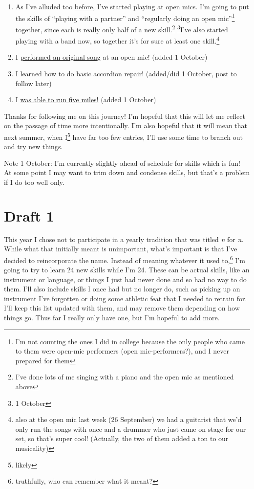 \documentclass[12pt]{article}[titlepage]
\newcommand{\say}[1]{``#1''}
\newcommand{\1}{\={a}}
\newcommand{\2}{\={e}}
\newcommand{\3}{\={\i}}
\newcommand{\4}{\=o}
\newcommand{\5}{\=u}
\newcommand{\6}{\={A}}
\renewcommand{\,}{\textsuperscript{,}}
\begin{document}
\begin{enumerate}
\item As I've alluded too \href{open-mic-2.html}{before}, I've started playing at open mics.
I'm going to put the skills of \say{playing with a partner} and \say{regularly doing an open mic}\footnote{I'm not counting the ones I did in college because the only people who came to them were open-mic performers (open mic-performers?), and I never prepared for them} together, since each is really only half of a new skill.\footnote{I've done lots of me singing with a piano and the open mic as mentioned above} \footnote{1 October}I've also started playing with a band now, so together it's for sure at least one skill.\footnote{also at the open mic last week (26 September) we had a guitarist that we'd only run the songs with once and a drummer who just came on stage for our set, so that's super cool! (Actually, the two of them added a ton to our musicality)}
\item I \href{performing-a-song.html}{performed an original song} at an open mic! (added 1 October)
\item I learned how to do basic accordion repair! (added/did 1 October, post to follow later)
\item I \href{running-2.html}{was able to run five miles!} (added 1 October)
\end{enumerate}

Thanks for following me on this journey!
I'm hopeful that this will let me reflect on the passage of time more intentionally.
I'm also hopeful that it will mean that next summer, when I\footnote{likely} have far too few entries, I'll use some time to branch out and try new things.

Note 1 October: I'm currently slightly ahead of schedule for skills which is fun! At some point I may want to trim down and condense skills, but that's a problem if I do too well only.

\section{Draft 1}
This year I chose not to participate in a yearly tradition that was titled \textit{n} for \textit{n}.
While what that initially meant is unimportant, what's important is that I've decided to reincorporate the name.
Instead of meaning whatever it used to,\footnote{truthfully, who can remember what it meant?} I'm going to try to learn 24 new skills while I'm 24.
These can be actual skills, like an instrument or language, or things I just had never done and so had no way to do them.
I'll also include skills I once had but no longer do, such as picking up an instrument I've forgotten or doing some athletic feat that I needed to retrain for.
I'll keep this list updated with them, and may remove them depending on how things go.
Thus far I really only have one, but I'm hopeful to add more.
\end{document}
